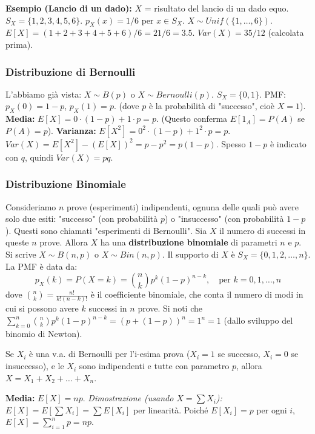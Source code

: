 \begin{example}
\textbf{Esempio (Lancio di un dado):}
$X$ = risultato del lancio di un dado equo.
$S_X = \{1, 2, 3, 4, 5, 6\}$. $p_X(x) = 1/6$ per $x \in S_X$. $X \sim Unif(\{1, \dots, 6\})$.
$E[X] = (1+2+3+4+5+6)/6 = 21/6 = 3.5$.
$Var(X) = 35/12$ (calcolata prima).
\end{example}

\subsubsection{Distribuzione di Bernoulli}
L'abbiamo già vista: $X \sim B(p)$ o $X \sim Bernoulli(p)$.
$S_X = \{0, 1\}$.
PMF: $p_X(0) = 1-p$, $p_X(1) = p$.
(dove $p$ è la probabilità di "successo", cioè $X=1$).
\textbf{Media:} $E[X] = 0 \cdot (1-p) + 1 \cdot p = p$.
(Questo conferma $E[1_A]=P(A)$ se $P(A)=p$).
\textbf{Varianza:}
$E[X^2] = 0^2 \cdot (1-p) + 1^2 \cdot p = p$.
$Var(X) = E[X^2] - (E[X])^2 = p - p^2 = p(1-p)$.
Spesso $1-p$ è indicato con $q$, quindi $Var(X)=pq$.

\subsubsection{Distribuzione Binomiale}
Consideriamo $n$ prove (esperimenti) indipendenti, ognuna delle quali può avere solo due esiti: "successo" (con probabilità $p$) o "insuccesso" (con probabilità $1-p$). Questi sono chiamati "esperimenti di Bernoulli".
Sia $X$ il numero di successi in queste $n$ prove. Allora $X$ ha una \textbf{distribuzione binomiale} di parametri $n$ e $p$. Si scrive $X \sim B(n,p)$ o $X \sim Bin(n,p)$.
Il supporto di $X$ è $S_X = \{0, 1, 2, \dots, n\}$.
La PMF è data da:
\[ p_X(k) = P(X=k) = \binom{n}{k} p^k (1-p)^{n-k}, \quad \text{per } k=0, 1, \dots, n \]
dove $\binom{n}{k} = \frac{n!}{k!(n-k)!}$ è il coefficiente binomiale, che conta il numero di modi in cui si possono avere $k$ successi in $n$ prove.
Si noti che $\sum_{k=0}^n \binom{n}{k} p^k (1-p)^{n-k} = (p + (1-p))^n = 1^n = 1$ (dallo sviluppo del binomio di Newton).

Se $X_i$ è una v.a. di Bernoulli per l'i-esima prova ($X_i=1$ se successo, $X_i=0$ se insuccesso), e le $X_i$ sono indipendenti e tutte con parametro $p$, allora $X = X_1 + X_2 + \dots + X_n$.

\textbf{Media:} $E[X] = np$.
\textit{Dimostrazione (usando $X=\sum X_i$):} $E[X] = E[\sum X_i] = \sum E[X_i]$ per linearità.
Poiché $E[X_i]=p$ per ogni $i$, $E[X] = \sum_{i=1}^n p = np$.

